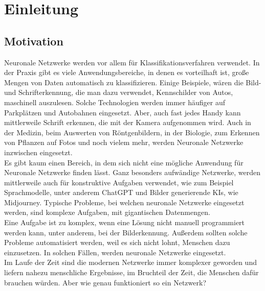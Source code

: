\documentclass[12pt]{article}
\begin{document}
\section{Einleitung}
\subsection{Motivation}
Neuronale Netzwerke werden vor allem für Klassifikationsverfahren verwendet. In der Praxis gibt es viele Anwendungsbereiche, in denen es vorteilhaft ist, große Mengen von Daten automatisch zu klassifizieren. Einige Beispiele, wären die Bild- und Schrifterkennung, die man dazu verwendet, Kennschilder von Autos, maschinell auszulesen. Solche Technologien werden immer häufiger auf Parkplätzen und Autobahnen eingesetzt. Aber, auch fast jedes Handy kann mittlerweile Schrift erkennen, die mit der Kamera aufgenommen wird. Auch in der Medizin, beim Auswerten von Röntgenbildern, in der Biologie, zum Erkennen von Pflanzen auf Fotos und noch vielem mehr, werden Neuronale Netzwerke inzwischen eingesetzt.\\
Es gibt kaum einen Bereich, in dem sich nicht eine mögliche Anwendung für Neuronale Netzwerke finden lässt. Ganz besonders aufwändige Netzwerke, werden mittlerweile auch für konstruktive Aufgaben verwendet, wie zum Beispiel Sprachmodelle, unter anderem ChatGPT und Bilder generierende KIs, wie Midjourney.
Typische Probleme, bei welchen neuronale Netzwerke eingesetzt werden, sind komplexe Aufgaben, mit gigantischen Datenmengen.\\
Eine Aufgabe ist zu komplex, wenn eine Lösung nicht manuell programmiert werden kann, unter anderem, bei der Bilderkennung. Außerdem sollten solche Probleme automatisiert werden, weil es sich nicht lohnt, Menschen dazu einzusetzen. 
In solchen Fällen, werden neuronale Netzwerke eingesetzt.\\
Im Laufe der Zeit sind die modernen Netzwerke immer komplexer geworden und liefern nahezu menschliche Ergebnisse, im Bruchteil der Zeit, die Menschen dafür brauchen würden. Aber wie genau funktioniert so ein Netzwerk?



\cleardoublepage
\sloppy
\end{document}
